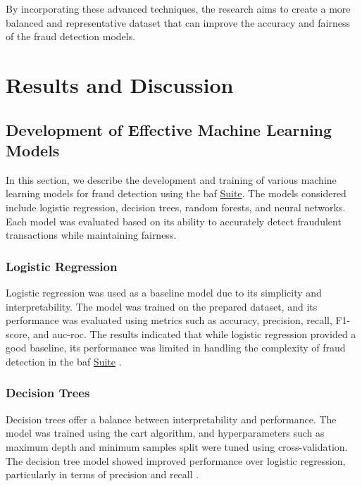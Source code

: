 \documentclass[12pt,a4paper]{report}
\begin{document}
By incorporating these advanced techniques, the research aims to create a more balanced and representative dataset that can improve the accuracy and fairness of the fraud detection models.


\chapter{Results and Discussion}
\section{Development of Effective Machine Learning Models}
In this section, we describe the development and training of various machine learning models for fraud detection using the \acrshort{baf} \href{https://www.kaggle.com/datasets/sgpjesus/bank-account-fraud-dataset-neurips-2022/code}{Suite}. The models considered include logistic regression, decision trees, random forests, and neural networks. Each model was evaluated based on its ability to accurately detect fraudulent transactions while maintaining fairness.

\subsection{Logistic Regression}
Logistic regression was used as a baseline model due to its simplicity and interpretability. The model was trained on the prepared dataset, and its performance was evaluated using metrics such as accuracy, precision, recall, F1-score, and \acrshort{auc}-\acrshort{roc}. The results indicated that while logistic regression provided a good baseline, its performance was limited in handling the complexity of fraud detection in the \acrshort{baf} \href{https://www.kaggle.com/datasets/sgpjesus/bank-account-fraud-dataset-neurips-2022/code}{Suite} \citep{bao2020detecting}.\\


\subsection{Decision Trees}
Decision trees offer a balance between interpretability and performance. The model was trained using the \acrshort{cart} algorithm, and hyperparameters such as maximum depth and minimum samples split were tuned using cross-validation. The decision tree model showed improved performance over logistic regression, particularly in terms of precision and recall \citep{pan2024machine}.\\
\end{document}
